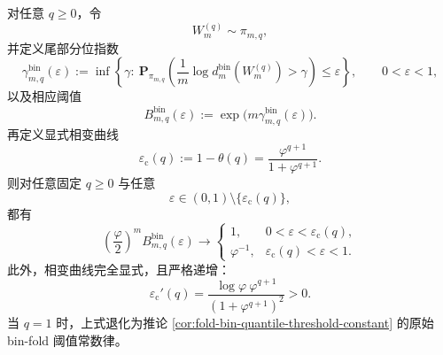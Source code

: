 \begin{theorem}\label{thm:xi-time-part9ob-escort-quantile-phase-diagram}
对任意 \(q\ge 0\)，令
\[
W_m^{(q)}\sim \pi_{m,q},
\]
并定义尾部分位指数
\[
\gamma_{m,q}^{\mathrm{bin}}(\varepsilon)
:=
\inf\left\{
\gamma:\ 
\mathbf P_{\pi_{m,q}}\!\left(
\frac{1}{m}\log d_m^{\mathrm{bin}}(W_m^{(q)})>\gamma
\right)\le \varepsilon
\right\},
\qquad
0<\varepsilon<1,
\]
以及相应阈值
\[
B_{m,q}^{\mathrm{bin}}(\varepsilon)
:=
\exp\!\bigl(m\gamma_{m,q}^{\mathrm{bin}}(\varepsilon)\bigr).
\]
再定义显式相变曲线
\[
\varepsilon_{\mathrm c}(q)
:=
1-\theta(q)
=
\frac{\varphi^{q+1}}{1+\varphi^{q+1}}.
\]
则对任意固定 \(q\ge 0\) 与任意
\[
\varepsilon\in(0,1)\setminus\{\varepsilon_{\mathrm c}(q)\},
\]
都有
\[
\boxed{\;
\left(\frac{\varphi}{2}\right)^m B_{m,q}^{\mathrm{bin}}(\varepsilon)
\longrightarrow
\begin{cases}
1, & 0<\varepsilon<\varepsilon_{\mathrm c}(q),\\[4pt]
\varphi^{-1}, & \varepsilon_{\mathrm c}(q)<\varepsilon<1.
\end{cases}
\;}
\]
此外，相变曲线完全显式，且严格递增：
\[
\varepsilon_{\mathrm c}'(q)
=
\frac{\log\varphi\ \varphi^{q+1}}{(1+\varphi^{q+1})^2}
>
0.
\]
当 \(q=1\) 时，上式退化为推论 \ref{cor:fold-bin-quantile-threshold-constant} 的原始 bin-fold 阈值常数律。
\end{theorem}
